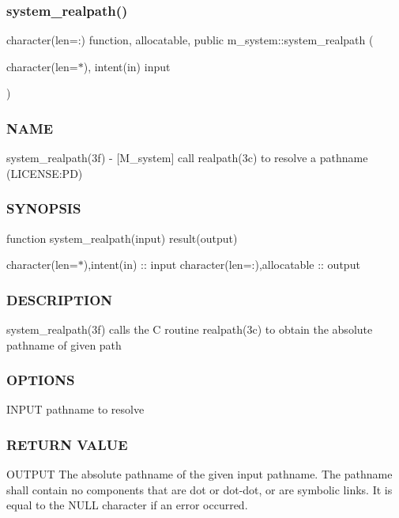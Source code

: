 \subsubsection{\texorpdfstring{system\+\_\+realpath()}{system\_realpath()}}
{\footnotesize\ttfamily character(len=\+:) function, allocatable, public m\+\_\+system\+::system\+\_\+realpath (\begin{DoxyParamCaption}\item[{character(len=$\ast$), intent(in)}]{input }\end{DoxyParamCaption})}



\subsubsection*{N\+A\+ME}

system\+\_\+realpath(3f) -\/ \mbox{[}M\+\_\+system\mbox{]} call realpath(3c) to resolve a pathname (L\+I\+C\+E\+N\+SE\+:PD) \subsubsection*{S\+Y\+N\+O\+P\+S\+IS}

function system\+\_\+realpath(input) result(output)

character(len=$\ast$),intent(in) \+:\+: input character(len=\+:),allocatable \+:\+: output \subsubsection*{D\+E\+S\+C\+R\+I\+P\+T\+I\+ON}

system\+\_\+realpath(3f) calls the C routine realpath(3c) to obtain the absolute pathname of given path \subsubsection*{O\+P\+T\+I\+O\+NS}

\begin{DoxyVerb}    INPUT     pathname to resolve
\end{DoxyVerb}


\subsubsection*{R\+E\+T\+U\+RN V\+A\+L\+UE}

O\+U\+T\+P\+UT The absolute pathname of the given input pathname. The pathname shall contain no components that are dot or dot-\/dot, or are symbolic links. It is equal to the N\+U\+LL character if an error occurred.


